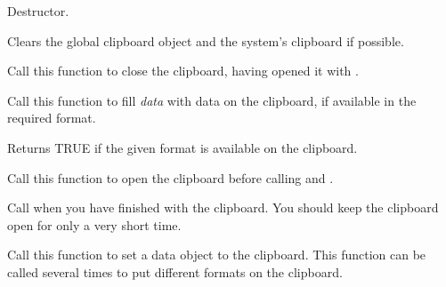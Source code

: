 
Destructor.

\label{wxclipboardclear}


Clears the global clipboard object and the system's clipboard if possible.

\label{wxclipboardclose}


Call this function to close the clipboard, having opened it with .

\label{wxclipboardgetdata}


Call this function to fill {\it data} with data on the clipboard, if available in the required
format.

\label{wxclipboardissupportedformat}


Returns TRUE if the given format is available on the clipboard.




\label{wxclipboardopen}


Call this function to open the clipboard before calling  
and .

Call  when you have finished with the clipboard. You
should keep the clipboard open for only a very short time.

\label{wxclipboardsetdata}


Call this function to set a data object to the clipboard. This function can be called several times
to put different formats on the clipboard.

